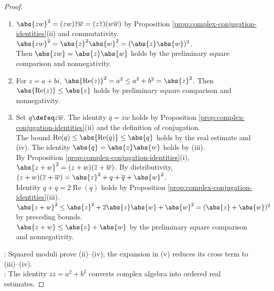 \begin{theorem}
\begin{proof}
\begin{enumerate}[label=(\roman*)]
\item $\abs{zw}^2=(zw)\overline{zw}=(z\overline{z})(w\overline{w})$ by Proposition \ref{prop:complex-conjugation-identities}(ii) and commutativity. $\abs{zw}^2=\abs{z}^2\abs{w}^2=(\abs{z}\abs{w})^2$.\\
Then $\abs{zw}=\abs{z}\abs{w}$ holds by the preliminary square comparison and nonnegativity.
\item For $z=a+bi$, $\abs{\operatorname{Re}(z)}^2=a^2\leq a^2+b^2=\abs{z}^2$. Then $\abs{\operatorname{Re}(z)}\leq\abs{z}$ holds by preliminary square comparison and nonnegativity.
\item Set $q\defeq z\overline{w}$. The identity $\overline{q}=\overline{z}w$ holds by Proposition \ref{prop:complex-conjugation-identities}(ii) and the definition of conjugation.\\
The bound $\operatorname{Re}(q)\leq\abs{\operatorname{Re}(q)}\leq\abs{q}$ holds by the real estimate and (iv). The identity $\abs{q}=\abs{z}\abs{w}$ holds by (iii).\\
By Proposition \ref{prop:complex-conjugation-identities}(i), $\abs{z+w}^2=(z+w)(\overline{z}+\overline{w})$. By distributivity, $(z+w)(\overline{z}+\overline{w})=\abs{z}^2+q+\overline{q}+\abs{w}^2$.\\
Identity $q+\overline{q}=2\operatorname{Re}(q)$ holds by Proposition \ref{prop:complex-conjugation-identities}(iii). $\abs{z+w}^2\leq\abs{z}^2+2\abs{z}\abs{w}+\abs{w}^2=(\abs{z}+\abs{w})^2$ by preceding bounds.\\
$\abs{z+w}\leq\abs{z}+\abs{w}$ by the preliminary square comparison and nonnegativity.
\end{enumerate}
: Squared moduli prove (ii)--(iv); the expansion in (v) reduces its cross term to (iii)--(iv).\\
: The identity $z\overline{z}=a^2+b^2$ converts complex algebra into ordered real estimates.
\end{proof}
\end{theorem}
